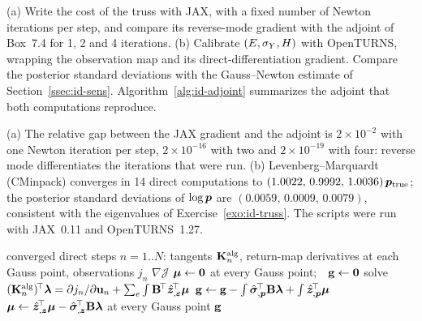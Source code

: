\label{exo:id-tools}
%
(a) Write the cost of the truss with JAX, with a fixed number of Newton iterations
per step, and compare its reverse-mode gradient with the adjoint of Box~7.4 for 1,
2 and 4 iterations. (b) Calibrate $(E,\sigma_{Y},H)$ with OpenTURNS, wrapping the
observation map and its direct-differentiation gradient. Compare the posterior
standard deviations with the Gauss--Newton estimate of Section~\ref{ssec:id-sens}.
Algorithm~\ref{alg:id-adjoint} summarizes the adjoint that both computations
reproduce.
\begin{solution}
(a) The relative gap between the JAX gradient and the adjoint is $2\times10^{-2}$ with
one Newton iteration per step, $2\times10^{-16}$ with two and $2\times10^{-19}$ with four:
reverse mode differentiates the iterations that were run. (b) Levenberg--Marquardt
(CMinpack) converges in 14 direct computations to
$(1.0022,\,0.9992,\,1.0036)\,\bm{p}_{\mathrm{true}}$; the posterior standard deviations of
$\log\bm{p}$ are $(0.0059,\,0.0009,\,0.0079)$, consistent with the eigenvalues of
Exercise~\ref{exo:id-truss}. The scripts were run with JAX~0.11 and
OpenTURNS~1.27.
\begin{algorithm}[H]
\caption{Discrete adjoint of an incremental elastoplastic computation}\label{alg:id-adjoint}
\begin{algorithmic}[1]
\Require converged direct steps $n=1..N$: tangents $\mathbf{K}^{\mathrm{alg}}_n$, return-map derivatives at each Gauss point, observations $j_n$
\Ensure $\nabla\mathcal J$
\State $\boldsymbol\mu\gets\bm{0}$ at every Gauss point;\ \ $\mathbf{g}\gets\bm{0}$ 
  \State solve $(\mathbf{K}^{\mathrm{alg}}_n)^{\!\top}\boldsymbol\lambda=\partial j_n/\partial\mathbf{u}_n+\sum_e\int\mathbf{B}^{\!\top}\hat{\bm{z}}_{,\bm{\varepsilon}}^{\!\top}\boldsymbol\mu$
  \State $\mathbf{g}\gets\mathbf{g}-\int\hat{\bm{\sigma}}_{,\bm{p}}^{\!\top}\mathbf{B}\boldsymbol\lambda+\int\hat{\bm{z}}_{,\bm{p}}^{\!\top}\boldsymbol\mu$
  \State $\boldsymbol\mu\gets\hat{\bm{z}}_{,\bm{z}}^{\!\top}\boldsymbol\mu-\hat{\bm{\sigma}}_{,\bm{z}}^{\!\top}\mathbf{B}\boldsymbol\lambda$ at every Gauss point 
\EndFor
\State \Return $\mathbf{g}$
\end{algorithmic}
\end{algorithm}


\end{solution}


